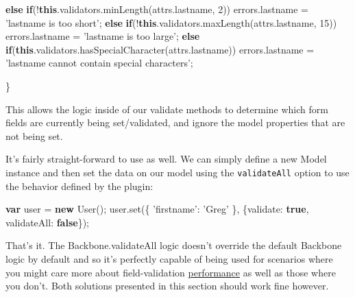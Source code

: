 \documentclass[9pt]{book}
\newenvironment{Shaded}{}{}
\newcommand{\KeywordTok}[1]{\textcolor[rgb]{0.00,0.44,0.13}{\textbf{{#1}}}}
\newcommand{\DataTypeTok}[1]{\textcolor[rgb]{0.56,0.13,0.00}{{#1}}}
\newcommand{\DecValTok}[1]{\textcolor[rgb]{0.25,0.63,0.44}{{#1}}}
\newcommand{\StringTok}[1]{\textcolor[rgb]{0.25,0.44,0.63}{{#1}}}
\newcommand{\OtherTok}[1]{\textcolor[rgb]{0.00,0.44,0.13}{{#1}}}
\newcommand{\FunctionTok}[1]{\textcolor[rgb]{0.02,0.16,0.49}{{#1}}}
\newcommand{\NormalTok}[1]{{#1}}
\begin{document}
\begin{Shaded}
\begin{Highlighting}[]
              \KeywordTok{else} \KeywordTok{if}\NormalTok{(!}\KeywordTok{this}\NormalTok{.}\OtherTok{validators}\NormalTok{.}\FunctionTok{minLength}\NormalTok{(}\OtherTok{attrs}\NormalTok{.}\FunctionTok{lastname}\NormalTok{, }\DecValTok{2}\NormalTok{))}
                \OtherTok{errors}\NormalTok{.}\FunctionTok{lastname} \NormalTok{= }\StringTok{'lastname is too short'}\NormalTok{;}
              \KeywordTok{else} \KeywordTok{if}\NormalTok{(!}\KeywordTok{this}\NormalTok{.}\OtherTok{validators}\NormalTok{.}\FunctionTok{maxLength}\NormalTok{(}\OtherTok{attrs}\NormalTok{.}\FunctionTok{lastname}\NormalTok{, }\DecValTok{15}\NormalTok{))}
                \OtherTok{errors}\NormalTok{.}\FunctionTok{lastname} \NormalTok{= }\StringTok{'lastname is too large'}\NormalTok{;}
              \KeywordTok{else} \KeywordTok{if}\NormalTok{(}\KeywordTok{this}\NormalTok{.}\OtherTok{validators}\NormalTok{.}\FunctionTok{hasSpecialCharacter}\NormalTok{(}\OtherTok{attrs}\NormalTok{.}\FunctionTok{lastname}\NormalTok{)) }\OtherTok{errors}\NormalTok{.}\FunctionTok{lastname} \NormalTok{= }\StringTok{'lastname cannot contain special characters'}\NormalTok{;}

          \NormalTok{\}}
\end{Highlighting}
\end{Shaded}

This allows the logic inside of our validate methods to determine which
form fields are currently being set/validated, and ignore the model
properties that are not being set.

It's fairly straight-forward to use as well. We can simply define a new
Model instance and then set the data on our model using the
\texttt{validateAll} option to use the behavior defined by the plugin:

\begin{Shaded}
\begin{Highlighting}[]
\KeywordTok{var} \NormalTok{user = }\KeywordTok{new} \FunctionTok{User}\NormalTok{();}
\OtherTok{user}\NormalTok{.}\FunctionTok{set}\NormalTok{(\{ }\StringTok{'firstname'}\NormalTok{: }\StringTok{'Greg'} \NormalTok{\}, \{}\DataTypeTok{validate}\NormalTok{: }\KeywordTok{true}\NormalTok{, }\DataTypeTok{validateAll}\NormalTok{: }\KeywordTok{false}\NormalTok{\});}
\end{Highlighting}
\end{Shaded}

That's it. The Backbone.validateAll logic doesn't override the default
Backbone logic by default and so it's perfectly capable of being used
for scenarios where you might care more about field-validation
\href{http://jsperf.com/backbone-validateall}{performance} as well as
those where you don't. Both solutions presented in this section should
work fine however.
\end{document}
